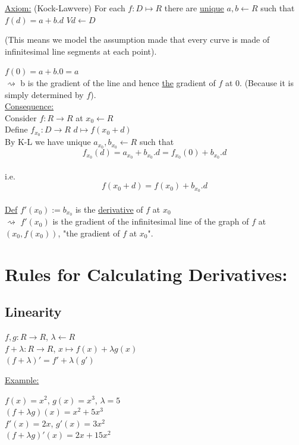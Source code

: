\documentclass[a4paper, 12pt]{article}
\begin{document}
\underline{Axiom:} (Kock-Lawvere) For each $f: D\mapsto R$ there are \underline{unique} $a,b \leftarrow R$ such that $f(d) = a +b.d$ $ Vd \leftarrow D$
\begin{multicols}{2}
(This means we model the assumption made that every curve is made of infinitesimal line segments at each point).
\end{multicols}
$f(0) = a+b.0 = a$\\
$\rightsquigarrow$ b is the gradient of the line and hence \underline{the} gradient of $f$ at $0$. (Because it is simply determined by $f$).\\
\underline{Consequence:}\\
Consider $f:R\rightarrow R$ at $x_0 \leftarrow R$\\
Define $f_{x_0} : D\rightarrow R$ $d\mapsto f(x_0 + d)$\\
By K-L we have unique $a_{x_0}, b_{x_0} \leftarrow R$ such that \\
$$f_{x_0}(d) = a_{x_0}+b_{x_0}.d =  f_{x_0}(0) + b_{x_0}.d$$\\
i.e. $$f(x_0 + d) = f(x_0) + b_{x_0}.d$$\\
\underline{Def} $f'(x_0) := b_{x_0}$ is the \underline{derivative} of $f$ at $x_0$\\
$\rightsquigarrow$ $f'(x_0)$ is the gradient of the infinitesimal line of the graph of $f$ at $(x_0,f(x_0))$, "the gradient of $f$ at $x_0$".\\

\section{Rules for Calculating Derivatives:}
\subsection{Linearity}
\begin{center}
$f,g : R \rightarrow R$, $\lambda \leftarrow R$\\
$f + \lambda : R \rightarrow R$, $ x \mapsto f(x) + \lambda g(x)$\\
$(f + \lambda)' = f' + \lambda(g')$\\
\end{center}
\underline{Example:}\\
\begin{center}
$f(x) = x^2$, $g(x) = x^3$, $\lambda = 5$\\
$(f+\lambda g)(x) = x^2 + 5x^3$\\
$f'(x) = 2x$, $g'(x) = 3x^2$\\
$(f+\lambda g)'(x) = 2x + 15x^2$\\
\end{center}
\end{document}
